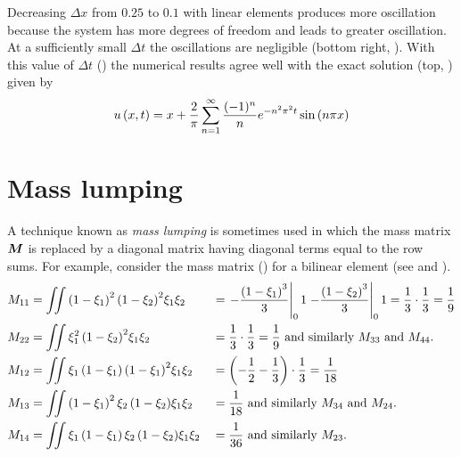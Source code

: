 Decreasing $\Delta x$ from $0.25$ to $0.1$ with linear elements produces more
oscillation because the system has more degrees of freedom and leads to greater
oscillation. At a sufficiently small $\Delta t$ the oscillations are
negligible (bottom right, ). With this value of $\Delta
t$ () the numerical results agree well with the exact solution
(top, ) given by
\begin{equation}
   u\left( x,t \right)  = x + \dfrac{2}{\pi} \displaystyle\sum_{n=1}^{\infty} \dfrac{(-1)^{n}}{n}
  e^{-n^{2}\pi^{2}t} \sin\left( n\pi x \right)
  \label{eqn:exact}
\end{equation}

\section{Mass lumping}
\label{sec:mass}

A technique known as \emph{mass lumping} is sometimes used
in which the mass matrix $\matr{M}$ is replaced by a diagonal matrix having
diagonal terms equal to the row sums. For example, consider the mass matrix
() for a bilinear element (see  and
).
\begin{alignat*}{2}
    M_{11} &= \iint{}{}{\ensuremath{\left( 1-\xi_{1} \right)}^{2}
        \ensuremath{\left( 1-\xi_{2} \right)}^{2}}{\xi_{1}}{\xi_{2}} &&
        =  \left. -\dfrac{\left( 1-\xi_{1} \right)^{3}}{3} \right|_{0} {1}
         \left. -\dfrac{\left( 1-\xi_{2} \right)^{3}}{3} \right|_{0} {1}=\dfrac{1}{3}\cdot
        \dfrac{1}{3} = \frac{1}{9} \\ 
    M_{22} &=
      \iint{}{}{\xi_{1}^{2}\ensuremath{\left( 1-\xi_{2} \right)}^{2}}
      {\xi_{1}}{\xi_{2}} &&=
      \dfrac{1}{3}\cdot\dfrac{1}{3} = \dfrac{1}{9} 
      \text{ and similarly $M_{33}$
      and $M_{44}$.} \\ 
    M_{12} &= \iint{}{}{\xi_{1}\ensuremath{\left( 1-\xi_{1} \right)}
      \ensuremath{\left( 1-\xi_{1} \right)}^{2}}{\xi_{1}}{\xi_{2}} &&= \left( -\dfrac{1}{2}
      -\dfrac{1}{3} \right)\cdot\dfrac{1}{3} = \dfrac{1}{18} \\ 
    M_{13} &= \iint{}{}{\ensuremath{\left( 1-\xi_{1} \right)}^{2}
        \xi_{2}\ensuremath{\left( 1-\xi_{2} \right)}}{\xi_{1}}{\xi_{2}} &&= \dfrac{1}{18} \text{
        and similarly $M_{34}$ and $M_{24}$.} \\ 
    M_{14} &= \iint{}{}{\xi_{1}\ensuremath{\left( 1-\xi_{1} \right)}
        \xi_{2}\ensuremath{\left( 1-\xi_{2} \right)}}{\xi_{1}}{\xi_{2}} 
        &&= \dfrac{1}{36} \text{ and similarly $M_{23}$.}
\end{alignat*}

